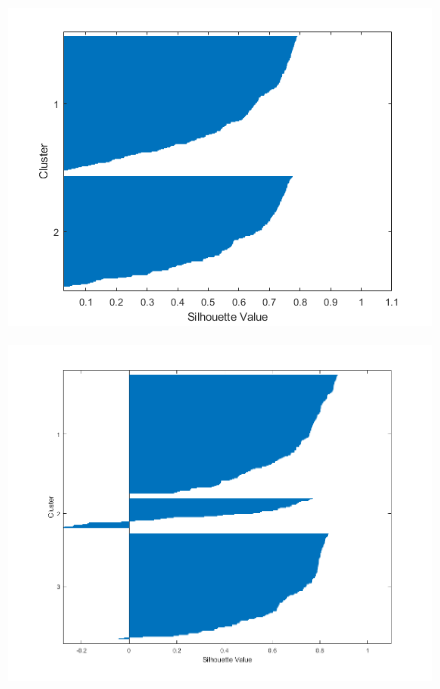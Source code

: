 \documentclass[sn-mathphys,Numbered]{sn-jnl}
\begin{document}
\begin{figure}[H]
\centering
\begin{minipage}{.5\textwidth}
  \centering
  \includegraphics[width=\linewidth]{silhouette_means_2}
  \label{fig:test1}
\end{minipage}%
\begin{minipage}{.5\textwidth}
  \centering
  \includegraphics[width=\linewidth]{silhouette_means_3}
  \label{fig:test2}
\end{minipage}
\end{figure}
\end{document}
